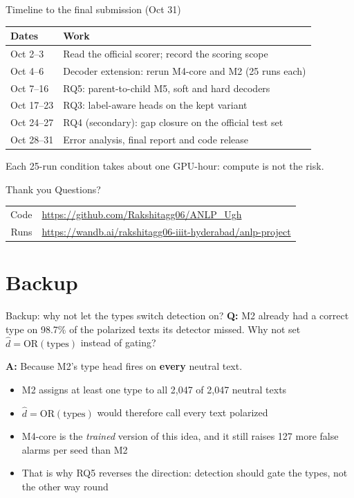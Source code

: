 \begin{frame}{Timeline to the final submission (Oct 31)}
\centering
\begin{tabular}{@{}lp{}@{}}
\toprule
Dates & Work \\
\midrule
Oct 2--3 & Read the official scorer; record the \TYPE{} scoring scope \\
Oct 4--6 & Decoder extension: rerun M4-core and M2 (25 runs each) \\
Oct 7--16 & RQ5: parent-to-child M5, soft and hard decoders \\
Oct 17--23 & RQ3: label-aware heads on the kept variant \\
Oct 24--27 & RQ4 (secondary): gap closure on the official test set \\
Oct 28--31 & Error analysis, final report and code release \\
\bottomrule
\end{tabular}

\vspace{8pt}
\small Each 25-run condition takes about one GPU-hour: compute is not the risk.
\end{frame}

\begin{frame}{Thank you}
\centering
\Large Questions?

\vspace{16pt}
\normalsize
\begin{tabular}{@{}rl@{}}
Code & \url{https://github.com/Rakshitagg06/ANLP_Ugh} \\[4pt]
Runs & \url{https://wandb.ai/rakshitagg06-iiit-hyderabad/anlp-project} \\
\end{tabular}
\end{frame}

\appendix
\section*{Backup}

\begin{frame}{Backup: why not let the types switch detection on?}
\textbf{Q:} M2 already had a correct type on 98.7\% of the polarized texts its
detector missed. Why not set $\hat d = \mathrm{OR}(\text{types})$ instead of gating?

\vspace{8pt}
\textbf{A:} Because M2's type head fires on \textbf{every} neutral text.
\begin{itemize}
\item M2 assigns at least one type to all 2{,}047 of 2{,}047 neutral texts
\item $\hat d = \mathrm{OR}(\text{types})$ would therefore call every text polarized
\item M4-core is the \emph{trained} version of this idea, and it still raises
  127 more false alarms per seed than M2
\item That is why RQ5 reverses the direction: detection should gate the types,
  not the other way round
\end{itemize}
\end{frame}

